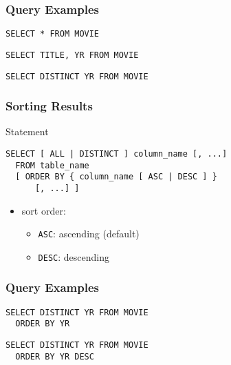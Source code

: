 \documentclass[dvipsnames]{beamer}
\theoremstyle{plain}
\begin{document}
\begin{frame}[fragile]
  \frametitle{Query Examples}

  \begin{example}
    \begin{lstlisting}
SELECT * FROM MOVIE
    \end{lstlisting}
  \end{example}

  \pause
  \begin{example}
    \begin{lstlisting}
SELECT TITLE, YR FROM MOVIE
    \end{lstlisting}
  \end{example}

  \pause
  \begin{example}
    \begin{lstlisting}
SELECT DISTINCT YR FROM MOVIE
    \end{lstlisting}
  \end{example}
\end{frame}

\begin{frame}[fragile]
  \frametitle{Sorting Results}

  \begin{block}{Statement}
    \begin{lstlisting}
SELECT [ ALL | DISTINCT ] column_name [, ...]
  FROM table_name
  [ ORDER BY { column_name [ ASC | DESC ] }
      [, ...] ]
    \end{lstlisting}
  \end{block}

  \pause
  \begin{itemize}
    \item sort order:
    \begin{itemize}
      \item \lstinline!ASC!: ascending (default)
      \item \lstinline!DESC!: descending
    \end{itemize}
  \end{itemize}
\end{frame}

\begin{frame}[fragile]
  \frametitle{Query Examples}

  \begin{example}
    \begin{lstlisting}
SELECT DISTINCT YR FROM MOVIE
  ORDER BY YR
    \end{lstlisting}
  \end{example}

  \pause
  \begin{example}
    \begin{lstlisting}
SELECT DISTINCT YR FROM MOVIE
  ORDER BY YR DESC
    \end{lstlisting}
  \end{example}
\end{frame}
\end{document}

